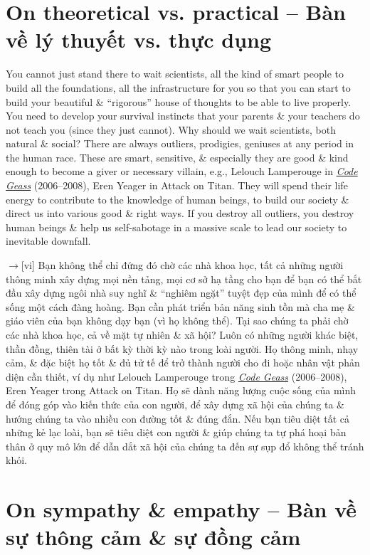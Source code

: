\documentclass[12pt,oneside]{book}
\begin{document}
\section{On theoretical vs. practical -- Bàn về lý thuyết vs. thực dụng}
You cannot just stand there to wait scientists, all the kind of smart people to build all the foundations, all the infrastructure for you so that you can start to build your beautiful \& ``rigorous'' house of thoughts to be able to live properly. You need to develop your survival instincts that your parents \& your teachers do not teach you (since they just cannot). Why should we wait scientists, both natural \& social? There are always outliers, prodigies, geniuses at any period in the human race. These are smart, sensitive, \& especially they are good \& kind enough to become a giver or necessary villain, e.g., {\sf Lelouch Lamperouge} in \href{https://www.imdb.com/title/tt0994314}{\it Code Geass} (2006--2008), {\sf Eren Yeager} in Attack on Titan. They will spend their life energy to contribute to the knowledge of human beings, to build our society \& direct us into various good \& right ways. If you destroy all outliers, you destroy human beings \& help us self-sabotage in a massive scale to lead our society to inevitable downfall.

{\sf[en]$\to$[vi]} Bạn không thể chỉ đứng đó chờ các nhà khoa học, tất cả những người thông minh xây dựng mọi nền tảng, mọi cơ sở hạ tầng cho bạn để bạn có thể bắt đầu xây dựng ngôi nhà suy nghĩ \& ``nghiêm ngặt'' tuyệt đẹp của mình để có thể sống một cách đàng hoàng. Bạn cần phát triển bản năng sinh tồn mà cha mẹ \& giáo viên của bạn không dạy bạn (vì họ không thể). Tại sao chúng ta phải chờ các nhà khoa học, cả về mặt tự nhiên \& xã hội? Luôn có những người khác biệt, thần đồng, thiên tài ở bất kỳ thời kỳ nào trong loài người. Họ thông minh, nhạy cảm, \& đặc biệt họ tốt \& đủ tử tế để trở thành người cho đi hoặc nhân vật phản diện cần thiết, ví dụ như {\sf Lelouch Lamperouge} trong \href{https://www.imdb.com/title/tt0994314}{\it Code Geass} (2006--2008), {\sf Eren Yeager} trong Attack on Titan. Họ sẽ dành năng lượng cuộc sống của mình để đóng góp vào kiến thức của con người, để xây dựng xã hội của chúng ta \& hướng chúng ta vào nhiều con đường tốt \& đúng đắn. Nếu bạn tiêu diệt tất cả những kẻ lạc loài, bạn sẽ tiêu diệt con người \& giúp chúng ta tự phá hoại bản thân ở quy mô lớn để dẫn dắt xã hội của chúng ta đến sự sụp đổ không thể tránh khỏi.

\section{On sympathy \& empathy -- Bàn về sự thông cảm \& sự đồng cảm}
\end{document}
